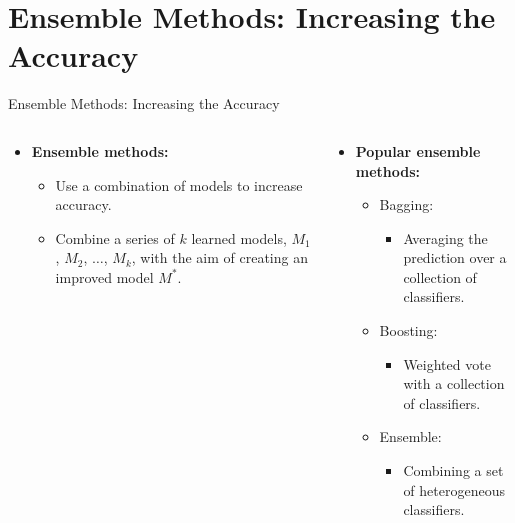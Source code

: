 \section{Ensemble Methods: Increasing the Accuracy}

\begin{frame}{Ensemble Methods: Increasing the Accuracy}
	\begin{columns}
		\begin{column}{0.4\textwidth}
			\centering
			\begin{itemize}
				\item \textbf{{\color{airforceblue}Ensemble} methods:}
				      \begin{itemize}
					      \item Use a combination of models to increase accuracy.
					      \item Combine a series of $k$ learned models, $M_1$, $M_2$, $\ldots$, $M_k$, with the aim of creating an improved model $M^*$.
				      \end{itemize}
			\end{itemize}
		\end{column}
		\begin{column}{0.5\textwidth}
			\centering
			\begin{itemize}
				\item \textbf{Popular ensemble methods:}
				      \begin{itemize}
					      \item Bagging:
					            \begin{itemize}
						            \item Averaging the prediction over a collection of classifiers.
					            \end{itemize}
					      \item Boosting:
					            \begin{itemize}
						            \item Weighted vote with a collection of classifiers.
					            \end{itemize}
					      \item Ensemble:
					            \begin{itemize}
						            \item Combining a set of heterogeneous classifiers.
					            \end{itemize}
				      \end{itemize}
			\end{itemize}
		\end{column}
	\end{columns}
\end{frame}

